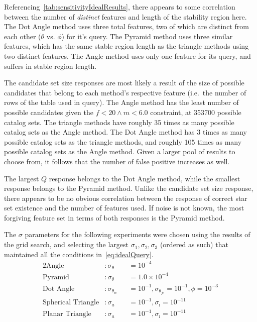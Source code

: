 Referencing~\autoref{tab:sensitivityIdealResults}, there appears to some correlation between the number of
\textit{distinct} features and length of the stability region here.
The Dot Angle method uses three total features, two of which are distinct from each other ($\theta$ vs. $\phi$) for
it's query.
The Pyramid method uses three similar features, which has the same stable region length as the triangle methods
using two distinct features.
The Angle method uses only one feature for its query, and suffers in stable region length.

The candidate set size responses are most likely a result of the size of possible candidates that belong to each
method's respective feature (i.e.\ the number of rows of the table used in query).
The Angle method has the least number of possible candidates given the $f < 20 \land m < 6.0$ constraint, at 353700
possible catalog sets.
The triangle methods have roughly 35 times as many possible catalog sets as the Angle method.
The Dot Angle method has 3 times as many possible catalog sets as the triangle methods, and roughly 105 times as many
possible catalog sets as the Angle method.
Given a larger pool of results to choose from, it follows that the number of false positive increases as well.

The largest $Q$ response belongs to the Dot Angle method, while the smallest response belongs to the Pyramid method.
Unlike the candidate set size response, there appears to be no obvious correlation between the response of correct
star set existence and the number of features used.
If noise is not known, the most forgiving feature set in terms of both responses is the Pyramid method.

The $\sigma$ parameters for the following experiments were chosen using the results of the grid search, and selecting
the largest $\sigma_1, \sigma_2, \sigma_3$ (ordered as such) that maintained all the
conditions in~\autoref{eq:idealQuery}.
\begin{alignat*}{2}
    \text{Angle}&: \sigma_\theta &&= 10^{-4}\\
    \text{Pyramid}&: \sigma_\theta &&= 1.0 \times 10^{-4}\\
    \text{Dot Angle}&: \sigma_{\theta_{ic}} &&= 10^{-1}, \sigma_{\theta_{jc}} = 10^{-1}, \phi = 10^{-3} \\
    \text{Spherical Triangle}&: \sigma_a &&= 10^{-1}, \sigma_\imath = 10^{-11} \\
    \text{Planar Triangle}&: \sigma_a &&= 10^{-1}, \sigma_\imath = 10^{-11}
\end{alignat*}

